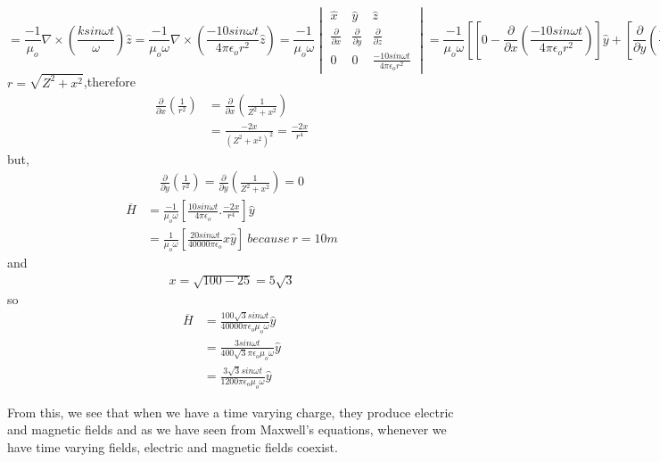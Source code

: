 \begin{exmp}
\begin{dmath*}
= \frac{-1}{\mu_o} \nabla\times\left(\frac{ksin\omega t}{\omega} \right)\hat{z}
= \frac{-1}{\mu_o\omega}\nabla\times\left(\frac{-10sin\omega t}{4\pi\epsilon_o r^2} \hat{z}\right)=\frac{-1}{\mu_o\omega}\begin{vmatrix}
\hat{x} &\hat{y} &\hat{z}\\
\frac{\partial}{\partial x} & \frac{\partial}{\partial y} & \frac{\partial}{\partial z} \\
0 &0 &\frac{-10sin\omega t}{4\pi\epsilon_o r^2}
\end{vmatrix}
= \frac{-1}{\mu_o\omega}\left[\left[  0 - \frac{\partial}{\partial x}\left( \frac{-10sin\omega t}{4\pi \epsilon_o r^2}\right)  \right]\hat{y} + \left[ \frac{\partial}{\partial y}\left(\frac{-10sin\omega t}{4 \pi\epsilon_o r^2} \right)\hat{x}\right]\right] 
\end{dmath*}
$r = \sqrt{Z^2 + x^2}$,therefore
\begin{align*}
\frac{\partial }{\partial x}\left(\frac{1}{r^2} \right) &=  \frac{\partial }{\partial x}\left(\frac{1}{Z^2 + x^2} \right)\\
&= \frac{-2x}{(Z^2 + x^2)^2} = \frac{-2x}{r^4} 
\end{align*}
but,
\begin{align*}
\frac{\partial}{\partial y}\left(\frac{1}{r^2} \right) = \frac{\partial}{\partial y}\left(\frac{1}{Z^2 + x^2} \right) = 0  
\end{align*}
\begin{align*}
\overline{H} &= \frac{-1}{\mu_o\omega}\left[ \frac{10sin\omega t}{4\pi\epsilon_o}.\frac{-2x}{r^4}\right]\hat{y} \\
&= \frac{1}{\mu_o\omega}\left[ \frac{20sin\omega t}{40000\pi\epsilon_o}x\hat{y}\right] \ because\ r = 10m 
\end{align*}
and
\begin{align*}
x = \sqrt{100 - 25} = 5\sqrt{3}
\end{align*}
so
\begin{align*}
\overline{H} &=  \frac{100\sqrt{3}sin\omega t}{40000\pi\epsilon_o\mu_o\omega}\hat{y}\\
&= \frac{3sin\omega t}{400\sqrt{3}\pi\epsilon_o\mu_o\omega}\hat{y} \\
&= \frac{3\sqrt{3}sin\omega t}{1200\pi\epsilon_o\mu_o\omega}\hat{y}
\end{align*}
\end{exmp}

From this, we see that when we have a time varying charge, they produce electric and magnetic fields and as we have seen from Maxwell's equations, whenever we have time varying fields, electric and magnetic fields coexist.

